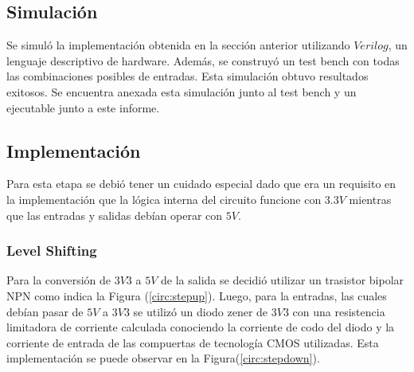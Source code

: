 \subsection{Simulación}

Se simuló la implementación obtenida en la sección anterior utilizando $Verilog$, un lenguaje descriptivo de hardware. Además, se construyó un test bench con todas las combinaciones posibles de entradas. Esta simulación obtuvo resultados exitosos. Se encuentra anexada esta simulación junto al test bench y un ejecutable junto a este informe.

\subsection{Implementación}
Para esta etapa se debió tener un cuidado especial dado que era un requisito en la implementación que la lógica interna del circuito funcione con $3.3V$ mientras que las entradas y salidas debían operar con $5V$.
\subsubsection{Level Shifting}
Para la conversión de $3V3$ a $5V$ de la salida se decidió utilizar un trasistor bipolar NPN como indica la Figura (\ref{circ:stepup}). Luego, para la entradas, las cuales debían pasar de $5V$ a $3V3$ se utilizó un diodo zener de $3V3$ con una resistencia limitadora de corriente calculada conociendo la corriente de codo del diodo y la corriente de entrada de las compuertas de tecnología CMOS utilizadas. Esta implementación se puede observar en la Figura(\ref{circ:stepdown}). 

